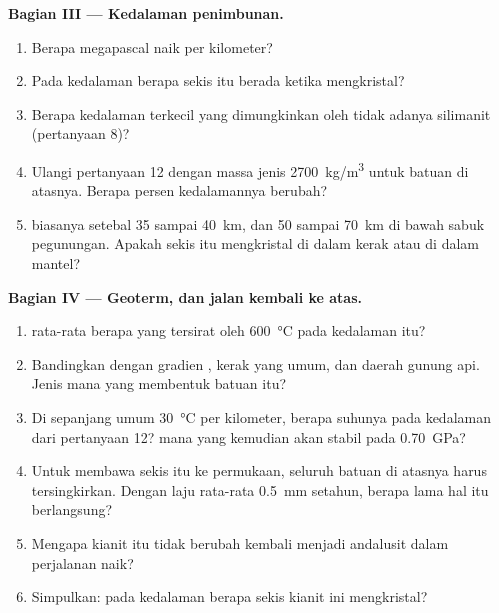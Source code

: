 \begin{problem}
\medskip
\noindent\textbf{Bagian III --- Kedalaman penimbunan.}
\begin{enumerate}[resume]
  \item Berapa megapascal  naik per kilometer?
  \item Pada kedalaman berapa sekis itu berada ketika mengkristal?
  \item Berapa kedalaman terkecil yang dimungkinkan oleh tidak adanya silimanit
        (pertanyaan 8)?
  \item Ulangi pertanyaan 12 dengan massa jenis \qty{2700}{kg/m^3} untuk batuan
        di atasnya. Berapa persen kedalamannya berubah?
  \item {} biasanya setebal 35 sampai \qty{40}{km}, dan 50 sampai
        \qty{70}{km} di bawah sabuk pegunungan. Apakah sekis itu mengkristal di
        dalam kerak atau di dalam mantel?
\end{enumerate}

\medskip
\noindent\textbf{Bagian IV --- Geoterm, dan jalan kembali ke atas.}
\begin{enumerate}[resume]
  \item {} rata-rata berapa yang tersirat oleh
        \qty{600}{\celsius} pada kedalaman itu?
  \item Bandingkan dengan gradien , kerak yang umum, dan daerah
        gunung api. Jenis  mana yang membentuk batuan itu?
  \item Di sepanjang  umum \qty{30}{\celsius} per kilometer, berapa
        suhunya pada kedalaman dari pertanyaan 12?  mana yang kemudian
        akan stabil pada \qty{0.70}{GPa}?
  \item Untuk membawa sekis itu ke permukaan, seluruh batuan di atasnya harus
        tersingkirkan. Dengan laju rata-rata \qty{0.5}{mm} setahun, berapa lama
        hal itu berlangsung?
  \item Mengapa kianit itu tidak berubah kembali menjadi andalusit dalam
        perjalanan naik?
  \item Simpulkan: pada kedalaman berapa sekis kianit ini mengkristal?
\end{enumerate}
\end{problem}
